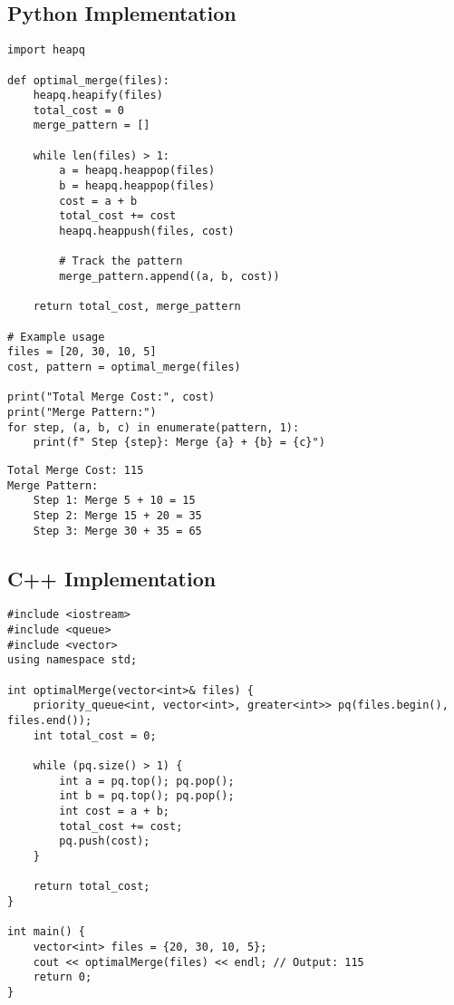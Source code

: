 \documentclass[14pt]{extarticle}
\begin{document}
\newpage
\subsection{Python Implementation}
\begin{lstlisting}[style=python, caption={Optimal Merge Pattern in Python}]
import heapq

def optimal_merge(files):
    heapq.heapify(files)
    total_cost = 0
    merge_pattern = []

    while len(files) > 1:
        a = heapq.heappop(files)
        b = heapq.heappop(files)
        cost = a + b
        total_cost += cost
        heapq.heappush(files, cost)

        # Track the pattern
        merge_pattern.append((a, b, cost))

    return total_cost, merge_pattern

# Example usage
files = [20, 30, 10, 5]
cost, pattern = optimal_merge(files)

print("Total Merge Cost:", cost)
print("Merge Pattern:")
for step, (a, b, c) in enumerate(pattern, 1):
    print(f" Step {step}: Merge {a} + {b} = {c}")
\end{lstlisting}

\begin{verbatim}
Total Merge Cost: 115
Merge Pattern:
    Step 1: Merge 5 + 10 = 15
    Step 2: Merge 15 + 20 = 35
    Step 3: Merge 30 + 35 = 65
\end{verbatim}

\newpage
\subsection{C++ Implementation}
\begin{lstlisting}[style=cpp, caption={Optimal Merge Pattern in C++}]
#include <iostream>
#include <queue>
#include <vector>
using namespace std;

int optimalMerge(vector<int>& files) {
    priority_queue<int, vector<int>, greater<int>> pq(files.begin(), files.end());
    int total_cost = 0;

    while (pq.size() > 1) {
        int a = pq.top(); pq.pop();
        int b = pq.top(); pq.pop();
        int cost = a + b;
        total_cost += cost;
        pq.push(cost);
    }

    return total_cost;
}

int main() {
    vector<int> files = {20, 30, 10, 5};
    cout << optimalMerge(files) << endl; // Output: 115
    return 0;
}
\end{lstlisting}
\end{document}
